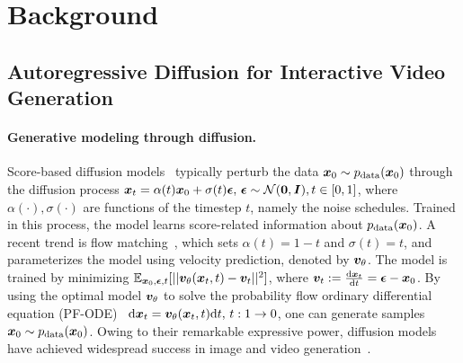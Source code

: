 \section{Background}
\subsection{Autoregressive Diffusion for Interactive Video Generation}
\label{sec: diffusion}

\paragraph{Generative modeling through diffusion.}
Score-based diffusion models~\cite{ho2020denoising, song2020score} typically perturb the data ${\bm{x}}_0\sim p_{\mathrm{data}}({\bm{x}}_0)$ through the diffusion process ${\bm{x}}_t = \alpha(t){\bm{x}}_0 + \sigma(t){\bm{\epsilon}}, \, {\bm{\epsilon}} \sim {\mathcal{N}}({\bm{0}}, {\bm{I}}), t\in [0,1]$, where $\alpha(\cdot),\sigma(\cdot)$ are functions of the timestep $t$, namely the noise schedules. Trained in this process, the model learns score-related information about $p_{\mathrm{data}}({\bm{x}}_0)$. A recent trend is flow matching~\cite{liu2022flow, lipman2022flow}, which sets $\alpha(t)=1-t$ and $\sigma(t)=t$, and parameterizes the model using velocity prediction, denoted by ${\bm{v}}_\theta$. The model is trained by minimizing $\mathbb{E}_{{\bm{x}}_0,{\bm{\epsilon}}, t}[||{\bm{v}}_\theta({\bm{x}}_t,t)-{\bm{v}}_t||^2]$, where ${\bm{v}}_t := \frac{\mathrm{d}{\bm{x}}_t}{\mathrm{d}t} = {\bm{\epsilon}} - {\bm{x}}_0$. By using the optimal model ${\bm{v}}_\theta$ to solve the probability flow ordinary differential equation (PF-ODE)~\cite{song2020score} $\mathrm{d}{\bm{x}}_t = {\bm{v}}_\theta({\bm{x}}_t,t)\mathrm{d}t,\,t:1\rightarrow 0$, one can generate samples ${\bm{x}}_0 \sim p_{\mathrm{data}}({\bm{x}}_0)$. Owing to their remarkable expressive power, diffusion models have achieved widespread success in image and video generation~\cite{zhao2022egsde,zhao2024identifying,bao2024vidu,zhao2025controlvideo,zhao2025riflex,zhao2025ultravico,zhao2025ultraimage}.

